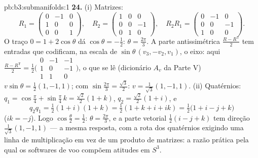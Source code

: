\begin{solution}{pb:b3:submanifolds:1}
\textbf{24.} (i) Matrizes:
\[
R_1 = \begin{pmatrix} 0 & -1 & 0\\ 1 & 0 & 0\\ 0 & 0 & 1
\end{pmatrix},
\quad
R_2 = \begin{pmatrix} 1 & 0 & 0\\ 0 & 0 & -1\\ 0 & 1 & 0
\end{pmatrix},
\quad
R_2R_1 = \begin{pmatrix} 0 & -1 & 0\\ 0 & 0 & -1\\ 1 & 0 &
0\end{pmatrix}.
\]
O traço $0 = 1 + 2\cos\theta$ dá $\cos\theta = -\frac12$:
$\theta = \frac{2\pi}3$. A parte antissimétrica $\frac{R -
R^{\mathsf T}}2$ tem entradas que codificam, na escala de $\sin\theta\,(v_3,
-v_2, v_1)$, o eixo: aqui $\frac{R - R^{\mathsf T}}2 =
\frac12\bigl(\begin{smallmatrix}0 & -1 & -1\\ 1 & 0 & -1\\ 1
& 1 & 0\end{smallmatrix}\bigr)$, o que se lê (dicionário
$A_v$ da Parte V) $v\sin\theta = \frac12(1, -1, 1)$; com
$\sin\frac{2\pi}3 = \frac{\sqrt3}2$: $v = \frac1{\sqrt3}(1,
-1, 1)$.
(ii) Quatérnios: $q_1 = \cos\frac\pi4 + \sin\frac\pi4\,k =
\frac{\sqrt2}2(1 + k)$, $q_2 = \frac{\sqrt2}2(1 + i)$, e
\[
q_2q_1 = \tfrac12(1 + i)(1 + k) = \tfrac12(1 + k + i + ik)
= \tfrac12\bigl(1 + i - j + k\bigr)
\]
($ik = -j$). Logo $\cos\frac\theta2 = \frac12$: $\theta =
\frac{2\pi}3$, e a parte vetorial $\frac12(i - j + k)$ tem
direção $\frac1{\sqrt3}(1, -1, 1)$ --- a mesma resposta,
com a rota dos quatérnios exigindo uma linha de
multiplicação em vez de um produto de matrizes: a razão
prática pela qual os softwares de voo compõem atitudes em $S^3$.


\end{solution}
